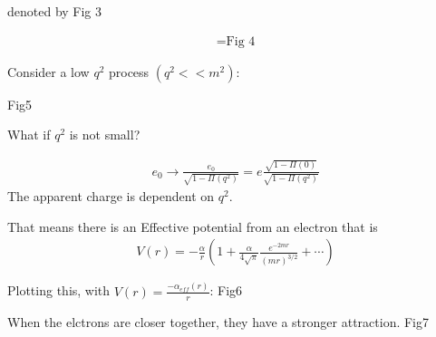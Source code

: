 \documentclass[]{scrartcl}
\begin{document}
denoted by Fig 3

\begin{gather}
	= \text{Fig 4}
\end{gather}

Consider a low $q^2$ process $(q^2 << m^2)$:

Fig5

What if $q^2$ is not small?

\begin{gather}
	e_0 \rightarrow \frac{e_0}{\sqrt{1-\Pi(q^2)}} = e\frac{\sqrt{1-\Pi(0)}}{\sqrt{1-\Pi(q^2)}}
\end{gather}
The apparent charge is dependent on $q^2$.

That means there is an Effective potential from an electron that is 
\begin{gather}
	V(r) = -\frac{\alpha}{r}\left(1 + \frac{\alpha}{4\sqrt\pi}\frac{e^{-2mr}}{(mr)^{3/2}} + \cdots\right)
\end{gather}

Plotting this, with $V(r) = \frac{-\alpha_{eff}(r)}{r}$: Fig6

When the elctrons are closer together, they have a stronger attraction. Fig7
\end{document}
